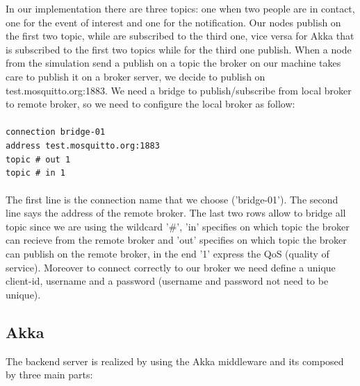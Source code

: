 \documentclass[10pt]{article}
\begin{document}
	In our implementation there are three topics: one when two people are in contact, one for the event of interest and one for the notification. Our nodes publish on the first two topic, while are subscribed to the third one, vice versa for Akka that is subscribed to the first two topics while for the third one publish. When a node from the simulation send a publish on a topic the broker on our machine takes care to publish it on a broker server, we decide to publish on test.mosquitto.org:1883. 
	We need a bridge to publish/subscribe from local broker to remote broker, so we need to configure the local broker as follow:\\
	\\
	\texttt{connection bridge-01 \\
	address test.mosquitto.org:1883 \\
	topic \# out 1 \\
	topic \# in 1  \\}
	\\
	The first line is the connection name that we choose ('bridge-01'). The second line says the address of the remote broker. The last two rows allow to bridge all topic since we are using the wildcard '\#', 'in' specifies on which topic the broker can recieve from the remote broker and 'out' specifies on which topic the broker can publish on the remote broker, in the end '1' express the QoS (quality of service). Moreover to connect correctly to our broker we need define a unique client-id, username and a password (username and password not need to be unique). 
	
	\subsection{Akka}
	The backend server is realized by using the Akka middleware and its composed by three main parts:
	
\end{document}
